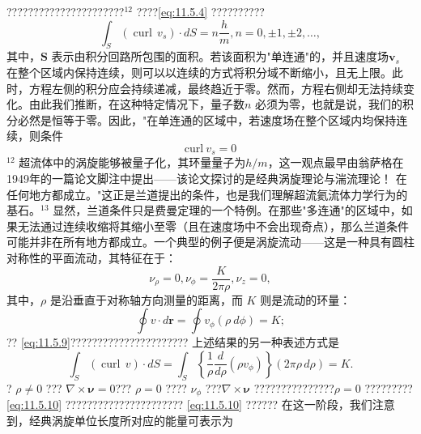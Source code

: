 ??????????????????????\(^{12}\) ????\autoref{eq:11.5.4} ??????????
\begin{equation}\tag{11.5.6}\label{eq:11.5.6}
\int _ { S } ( \operatorname { c u r l } \, v _ { s } ) \cdot d S = n { \frac { h } { m } } ,  n = 0 , \pm 1 , \pm 2 , \ldots ,
\end{equation}
其中，\(\mathbf{S}\) 表示由积分回路所包围的面积。若该面积为"单连通"的，并且速度场\(\boldsymbol{v}_{s}\) 在整个区域内保持连续，则可以以连续的方式将积分域不断缩小，且无上限。此时，方程左侧的积分应会持续递减，最终趋近于零。然而，方程右侧却无法持续变化。由此我们推断，在这种特定情况下，量子数\(n\) 必须为零，也就是说，我们的积分必然是恒等于零。因此，"在单连通的区域中，若速度场在整个区域内均保持连续，则条件
\begin{equation}\tag{11.5.7}\label{eq:11.5.7}
\mathrm { c u r l } \ v _ { s } = 0
\end{equation}
\(^{12}\) 超流体中的涡旋能够被量子化，其环量量子为\(h/m\)，这一观点最早由翁萨格在1949年的一篇论文脚注中提出——该论文探讨的是经典涡旋理论与湍流理论！
在任何地方都成立。"这正是兰道提出的条件，也是我们理解超流氦流体力学行为的基石。\(^{13}\)
显然，兰道条件只是费曼定理的一个特例。在那些"多连通"的区域中，如果无法通过连续收缩将其缩小至零（且在速度场中不会出现奇点），那么兰道条件可能并非在所有地方都成立。一个典型的例子便是涡旋流动——这是一种具有圆柱对称性的平面流动，其特征在于：
\begin{equation}\tag{11.5.8}\label{eq:11.5.8}
\nu _ { \rho } = 0 ,  \nu _ { \phi } = \frac { K } { 2 \pi \rho } ,  \nu _ { z } = 0 ,
\end{equation}
其中，\(\rho\) 是沿垂直于对称轴方向测量的距离，而 \(K\) 则是流动的环量：
\begin{equation}\tag{11.5.9}\label{eq:11.5.9}
\oint v \cdot d \mathbf { r } = \oint v _ { \phi } ( \rho \ d \phi ) = K ;
\end{equation}
?? \autoref{eq:11.5.9}??????????????????????
上述结果的另一种表述方式是
\begin{equation}\tag{11.5.10}\label{eq:11.5.10}
\int _ { S } ( \operatorname { c u r l } \,  v ) \cdot d S = \int _ { S } \left\{ { \frac { 1 } { \rho } } { \frac { d } { d \rho } } ( \rho v _ { \phi } ) \right\} ( 2 \pi \rho \, d \rho ) = K .
\end{equation}
? \(\rho \neq 0\) ??? \(\nabla \times \boldsymbol{\nu}=0\)??? \(\rho=0\) ???? \(\nu_{\phi}\) ???\(\nabla \times \boldsymbol{\nu}\) ???????????????\(\rho=0\) ????????? \autoref{eq:11.5.10} ?????????????????????? \autoref{eq:11.5.10} ??????
在这一阶段，我们注意到，经典涡旋单位长度所对应的能量可表示为
